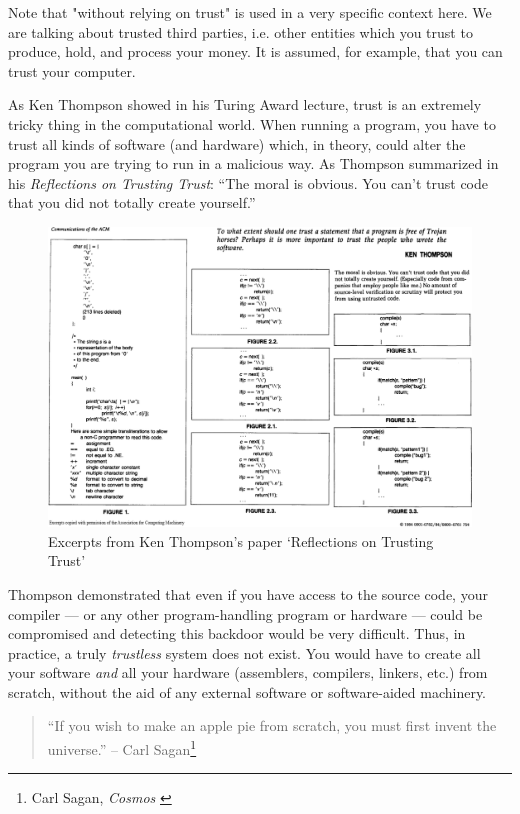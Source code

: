 Note that "without relying on trust" is used in a very specific context
here. We are talking about trusted third parties, i.e. other entities
which you trust to produce, hold, and process your money. It is assumed,
for example, that you can trust your computer.

As Ken Thompson showed in his Turing Award lecture, trust is an
extremely tricky thing in the computational world. When running a
program, you have to trust all kinds of software (and hardware) which,
in theory, could alter the program you are trying to run in a malicious
way. As Thompson summarized in his \textit{Reflections on Trusting Trust}:
\enquote{The moral is obvious. You can't trust code that you did not totally
create yourself.}~\cite{trusting-trust}

\begin{figure}
  \includegraphics{assets/images/ken-thompson-hack.png}
  \caption{Excerpts from Ken Thompson's paper `Reflections on Trusting Trust'}
  \label{fig:ken-thompson-hack}
\end{figure}

Thompson demonstrated that even if you have access to the source code,
your compiler --- or any other program-handling program or
hardware --- could be compromised and detecting this backdoor would be
very difficult. Thus, in practice, a truly \textit{trustless} system does not
exist. You would have to create all your software \textit{and} all your
hardware (assemblers, compilers, linkers, etc.) from scratch, without
the aid of any external software or software-aided machinery.

\begin{quotation}
``If you wish to make an apple pie from scratch, you must first invent
the universe.''
\flushright -- Carl Sagan\footnote{Carl Sagan, \textit{Cosmos} \cite{cosmos}}
\end{quotation}

